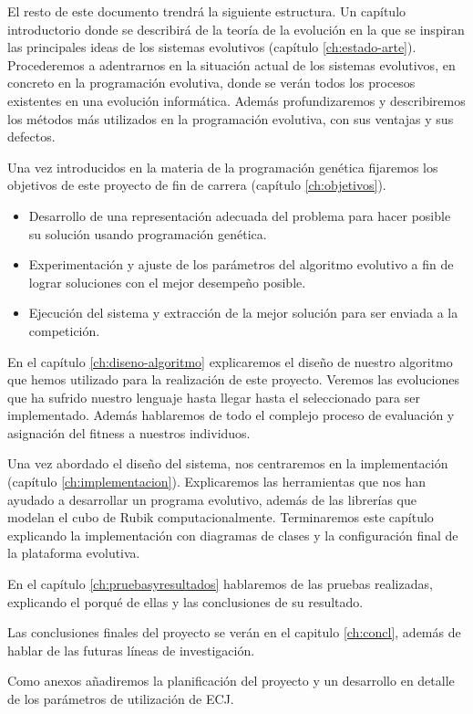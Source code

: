 El resto de este documento trendrá la siguiente estructura. Un capítulo
introductorio donde se describirá de la teoría de la evolución en la que se
inspiran las principales ideas de los sistemas evolutivos
(capítulo \ref{ch:estado-arte}). Procederemos a adentrarnos en la  situación actual de los sistemas evolutivos, en concreto en la programación evolutiva, donde se verán todos los procesos existentes en una evolución informática. Además profundizaremos y
describiremos los métodos más utilizados en la programación evolutiva, con sus
ventajas y sus defectos.

Una vez introducidos en la materia de la programación genética fijaremos los
objetivos de este proyecto de fin de carrera (capítulo \ref{ch:objetivos}).

\begin{itemize}
  \item Desarrollo de una representación adecuada del problema para hacer posible su solución usando
  programación genética.
  \item Experimentación y ajuste de los parámetros del algoritmo evolutivo a fin de lograr soluciones con el
  mejor desempeño posible.
  \item Ejecución del sistema y extracción de la mejor solución para ser
  enviada a la competición.
\end{itemize}

En el capítulo \ref{ch:diseno-algoritmo} explicaremos el diseño de nuestro algoritmo que hemos
utilizado para la realización de este proyecto. Veremos las evoluciones que ha
sufrido nuestro lenguaje hasta llegar hasta el seleccionado para ser
implementado. Además hablaremos de todo el complejo proceso de evaluación y
asignación del fitness a nuestros individuos.

Una vez abordado el diseño del sistema, nos centraremos en la implementación
(capítulo \ref{ch:implementacion}). Explicaremos las herramientas que nos han
ayudado a desarrollar un programa evolutivo, además de las librerías que modelan
el cubo de Rubik computacionalmente. Terminaremos este capítulo explicando la
implementación con diagramas de clases y la configuración final de la
plataforma evolutiva.

En el capítulo \ref{ch:pruebasyresultados} hablaremos de las pruebas realizadas, explicando el
porqué de ellas y las conclusiones de su resultado.

Las conclusiones finales del proyecto se verán en el capitulo \ref{ch:concl}, además de
hablar de las futuras líneas de investigación.

Como anexos añadiremos la planificación del proyecto y un desarrollo en detalle
de los parámetros de utilización de ECJ.
